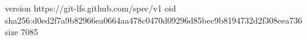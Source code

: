 version https://git-lfs.github.com/spec/v1
oid sha256:d0ed2f7a9b82966ea0664aa478c0470d09296d85bec9b8194732d2f308eea736
size 7085
